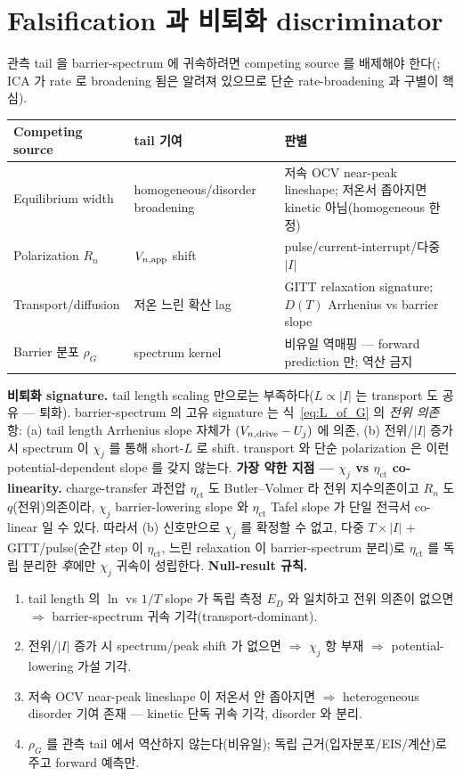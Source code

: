 \section{Falsification 과 비퇴화 discriminator}\label{sec:falsify}
관측 tail 을 barrier-spectrum 에 귀속하려면 competing source 를 배제해야 한다(; ICA 가 rate 로
broadening 됨은 알려져 있으므로 \cite{dubarry2022,fly2020} 단순 rate-broadening 과 구별이 핵심).
\begin{longtable}{p{} p{} p{}}
\toprule Competing source & tail 기여 & 판별 \\ \midrule \endhead
Equilibrium width & homogeneous/disorder broadening & 저속 OCV near-peak lineshape; 저온서 좁아지면 kinetic 아님(homogeneous 한정) \\
Polarization $R_n$ & $V_{n,\mathrm{app}}$ shift & pulse/current-interrupt/다중 $|I|$ \\
Transport/diffusion & 저온 느린 확산 lag & GITT relaxation signature; $D(T)$ Arrhenius vs barrier slope \\
Barrier 분포 $\rho_G$ \cite{plonka2001} & spectrum kernel & 비유일 역매핑 — forward prediction 만; 역산 금지 \\
\bottomrule
\end{longtable}
\textbf{비퇴화 signature.} tail length scaling 만으로는 부족하다($L\propto|I|$ 는 transport 도 공유 —
퇴화). barrier-spectrum 의 고유 signature 는 식~\eqref{eq:L_of_G} 의 \emph{전위 의존} 항: (a) tail length
Arrhenius slope 자체가 $(V_{n,\mathrm{drive}}-U_j)$ 에 의존, (b) 전위/$|I|$ 증가 시 spectrum 이 $\chi_j$ 를 통해
short-$L$ 로 shift. transport 와 단순 polarization 은 이런 potential-dependent slope 를 갖지 않는다.
\textbf{가장 약한 지점 — $\chi_j$ vs $\eta_\mathrm{ct}$ co-linearity.} charge-transfer 과전압
$\eta_\mathrm{ct}$ 도 Butler--Volmer 라 전위 지수의존이고 $R_n$ 도 $q$(전위)의존이라, $\chi_j$
barrier-lowering slope 와 $\eta_\mathrm{ct}$ Tafel slope 가 단일 전극서 co-linear 일 수 있다. 따라서 (b)
신호만으로 $\chi_j$ 를 확정할 수 없고, 다중 $T\times|I|$ + GITT/pulse(순간 step 이 $\eta_\mathrm{ct}$, 느린
relaxation 이 barrier-spectrum 분리)로 $\eta_\mathrm{ct}$ 를 독립 분리한 \emph{후}에만 $\chi_j$ 귀속이 성립한다.
\textbf{Null-result 규칙.}
\begin{enumerate}[label=(N\arabic*),leftmargin=2.2em]
\item tail length 의 $\ln$ vs $1/T$ slope 가 독립 측정 $E_D$ 와 일치하고 전위 의존이 없으면 $\Rightarrow$
  barrier-spectrum 귀속 기각(transport-dominant).
\item 전위/$|I|$ 증가 시 spectrum/peak shift 가 없으면 $\Rightarrow$ $\chi_j$ 항 부재 $\Rightarrow$
  potential-lowering 가설 기각.
\item 저속 OCV near-peak lineshape 이 저온서 안 좁아지면 $\Rightarrow$ heterogeneous disorder 기여 존재 —
  kinetic 단독 귀속 기각, disorder 와 분리.
\item $\rho_G$ 를 관측 tail 에서 역산하지 않는다(비유일); 독립 근거(입자분포/EIS/계산)로 주고 forward 예측만.
\end{enumerate}

